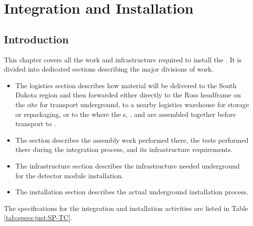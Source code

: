 \chapter{Integration and Installation}
\label{ch:sp-tc}

\section{Introduction}
\label{ch:sp-tc-intro}




This  chapter covers all the work and infrastructure required to install the .  It is divided into dedicated sections describing the major divisions of work.  

\begin{itemize}
\item The logistics section describes how material will be delivered to the South Dakota region and then forwarded  either  directly to the Ross headframe on the  site for transport underground, to a nearby logistics warehouse for storage or repackaging, or to the   where the  s, , and  are assembled together before transport to . 
\item The  section describes the assembly work performed there, the tests performed there during the integration process, and its infrastructure requirements.
\item The infrastructure section describes the infrastructure needed underground for the detector module installation.
\item The installation section describes the actual underground installation process. 
\end{itemize}
 The specifications for the integration and installation activities are listed in Table \ref{tab:specs:just:SP-TC}.

